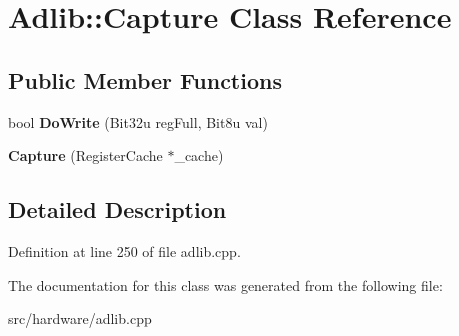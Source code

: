 \hypertarget{classAdlib_1_1Capture}{\section{Adlib\-:\-:Capture Class Reference}
\label{classAdlib_1_1Capture}
}
\subsection*{Public Member Functions}
\begin{DoxyCompactItemize}
\item 
\hypertarget{classAdlib_1_1Capture_a2bc4e88dfc7ead50b3cd50fded3cfbaa}{bool {\bfseries Do\-Write} (Bit32u reg\-Full, Bit8u val)}\label{classAdlib_1_1Capture_a2bc4e88dfc7ead50b3cd50fded3cfbaa}

\item 
\hypertarget{classAdlib_1_1Capture_a42d440dbc3803819534a51e9434c8f4e}{{\bfseries Capture} (Register\-Cache $\ast$\-\_\-cache)}\label{classAdlib_1_1Capture_a42d440dbc3803819534a51e9434c8f4e}

\end{DoxyCompactItemize}


\subsection{Detailed Description}


Definition at line 250 of file adlib.\-cpp.



The documentation for this class was generated from the following file\-:\begin{DoxyCompactItemize}
\item 
src/hardware/adlib.\-cpp\end{DoxyCompactItemize}
